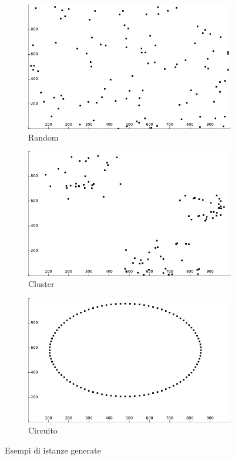 \begin{figure}
\centering
\begin{subfigure}[h]{0.45\textwidth}
\includegraphics[width=\textwidth]{Images/Part_1/Instances/Random.png}
\caption{Random}
\label{pt1:generator:random_img}
\end{subfigure}
\quad{}
\begin{subfigure}[h]{0.45\textwidth}
\includegraphics[width=\textwidth]{Images/Part_1/Instances/Cluster.png}
\caption{Cluster}
\label{pt1:generator:cluster_img}
\end{subfigure}

\begin{subfigure}[h]{0.5\textwidth}
\includegraphics[width=\textwidth]{Images/Part_1/Instances/Circle.png}
\caption{Circuito}
\label{pt1:generator:Circle_img}
\end{subfigure}
\caption{Esempi di istanze generate}
\label{pt1:generator:imgs}
\end{figure}
